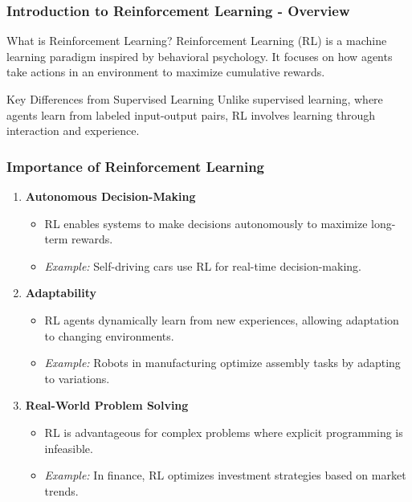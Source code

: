 \documentclass[aspectratio=169]{beamer}
\begin{document}
\frame{\titlepage}

\begin{frame}[fragile]
    \frametitle{Introduction to Reinforcement Learning - Overview}
    \begin{block}{What is Reinforcement Learning?}
        Reinforcement Learning (RL) is a machine learning paradigm inspired by behavioral psychology. It focuses on how agents take actions in an environment to maximize cumulative rewards.
    \end{block}
    \begin{block}{Key Differences from Supervised Learning}
        Unlike supervised learning, where agents learn from labeled input-output pairs, RL involves learning through interaction and experience.
    \end{block}
\end{frame}

\begin{frame}[fragile]
    \frametitle{Importance of Reinforcement Learning}
    \begin{enumerate}
        \item \textbf{Autonomous Decision-Making}
            \begin{itemize}
                \item RL enables systems to make decisions autonomously to maximize long-term rewards.
                \item \textit{Example:} Self-driving cars use RL for real-time decision-making.
            \end{itemize}
        \item \textbf{Adaptability}
            \begin{itemize}
                \item RL agents dynamically learn from new experiences, allowing adaptation to changing environments.
                \item \textit{Example:} Robots in manufacturing optimize assembly tasks by adapting to variations.
            \end{itemize}
        \item \textbf{Real-World Problem Solving}
            \begin{itemize}
                \item RL is advantageous for complex problems where explicit programming is infeasible.
                \item \textit{Example:} In finance, RL optimizes investment strategies based on market trends.
            \end{itemize}
    \end{enumerate}
\end{frame}
\end{document}
